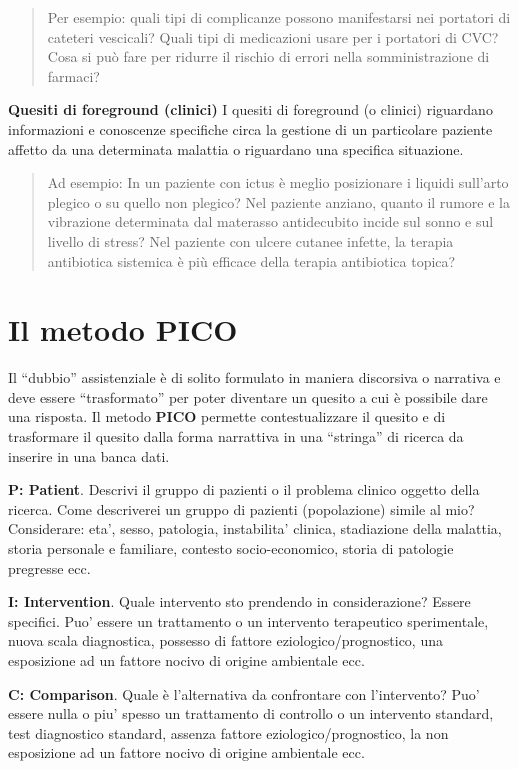 \documentclass[]{book}
\begin{document}
\begin{quote}
Per esempio: quali tipi di complicanze possono manifestarsi nei portatori di cateteri vescicali? Quali tipi di medicazioni usare per i portatori di CVC? Cosa si può fare per ridurre il rischio di errori nella somministrazione di farmaci?
\end{quote}

\textbf{Quesiti di foreground (clinici)} I quesiti di foreground (o clinici) riguardano informazioni e conoscenze specifiche circa la gestione di un particolare paziente affetto da una determinata malattia o riguardano una specifica situazione.

\begin{quote}
Ad esempio: In un paziente con ictus è meglio posizionare i liquidi sull'arto plegico o su quello non plegico? Nel paziente anziano, quanto il rumore e la vibrazione determinata dal materasso antidecubito incide sul sonno e sul livello di stress? Nel paziente con ulcere cutanee infette, la terapia antibiotica sistemica è più efficace della terapia antibiotica topica?
\end{quote}

\hypertarget{il-metodo-pico}{%
\section{Il metodo PICO}\label{il-metodo-pico}}

Il ``dubbio'' assistenziale è di solito formulato in maniera discorsiva o narrativa e deve essere ``trasformato'' per poter diventare un quesito a cui è possibile dare una risposta. Il metodo \textbf{PICO} permette contestualizzare il quesito e di trasformare il quesito dalla forma narrattiva in una ``stringa'' di ricerca da inserire in una banca dati.

\textbf{P: Patient}. Descrivi il gruppo di pazienti o il problema clinico oggetto della ricerca. Come descriverei un gruppo di pazienti (popolazione) simile al mio? Considerare: eta', sesso, patologia, instabilita' clinica, stadiazione della malattia, storia personale e familiare, contesto socio-economico, storia di patologie pregresse ecc.

\textbf{I: Intervention}. Quale intervento sto prendendo in considerazione? Essere specifici. Puo' essere un trattamento o un intervento terapeutico sperimentale, nuova scala diagnostica, possesso di fattore eziologico/prognostico, una esposizione ad un fattore nocivo di origine ambientale ecc.

\textbf{C: Comparison}. Quale è l'alternativa da confrontare con l'intervento? Puo' essere nulla o piu' spesso un trattamento di controllo o un intervento standard, test diagnostico standard, assenza fattore eziologico/prognostico, la non esposizione ad un fattore nocivo di origine ambientale ecc.
\end{document}

